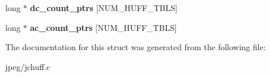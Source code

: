 \begin{DoxyCompactItemize}
\item 
long $\ast$ {\bfseries dc\+\_\+count\+\_\+ptrs} \mbox{[}N\+U\+M\+\_\+\+H\+U\+F\+F\+\_\+\+T\+B\+LS\mbox{]}\hypertarget{structhuff__entropy__encoder_aee66f11440e615c95b333d71d3613513}{}\label{structhuff__entropy__encoder_aee66f11440e615c95b333d71d3613513}

\item 
long $\ast$ {\bfseries ac\+\_\+count\+\_\+ptrs} \mbox{[}N\+U\+M\+\_\+\+H\+U\+F\+F\+\_\+\+T\+B\+LS\mbox{]}\hypertarget{structhuff__entropy__encoder_acc141b7e17ee817d92b9340d603dde9e}{}\label{structhuff__entropy__encoder_acc141b7e17ee817d92b9340d603dde9e}

\end{DoxyCompactItemize}


The documentation for this struct was generated from the following file\+:\begin{DoxyCompactItemize}
\item 
jpeg/jchuff.\+c\end{DoxyCompactItemize}
